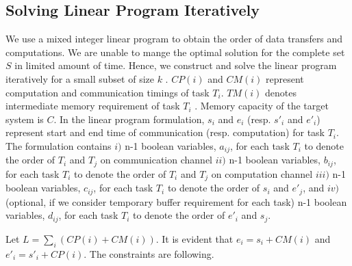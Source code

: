 \documentclass[runningheads]{llncs} %
\begin{document}
\subsection{Solving Linear Program Iteratively}
\label{subsec:linearprogrammingformulation}
We use a mixed integer linear program  to obtain the order of data transfers and computations. We are unable to mange the optimal solution for the complete set $S$ in limited amount of time.  Hence, we construct and solve the linear program iteratively for a small subset of size $k$ . $CP(i)$ and $CM(i)$ represent computation and communication timings of task $T_i$. $TM(i)$ denotes intermediate memory requirement of task $T_i$ . Memory capacity of the  target system is $C$. In the linear program formulation, $s_i$ and $e_i$ (resp. $s'_i$ and $e'_i$) represent start and end time of communication (resp. computation) for task $T_i$. The formulation contains $i)$ n-1 boolean variables, $a_{ij}$, for each task $T_i$ to denote the order of $T_i$ and $T_j$  on communication channel   $ii)$ n-1 boolean variables, $b_{ij}$, for each task $T_i$ to denote the order of $T_i$ and $T_j$  on computation channel $iii)$ n-1 boolean variables, $c_{ij}$, for each task $T_i$ to denote the order of $s_i$ and $e'_j$, and $iv)$ (optional, if we consider temporary buffer requirement for each task) n-1 boolean variables, $d_{ij}$, for each task $T_i$ to denote the order of $e'_i$ and $s_j$.



\noindent Let $L=\sum_i (CP(i) + CM(i))$. It is evident that $e_i =s_i + CM(i)$ and $e'_i =s'_i + CP(i)$. The constraints are following.
\end{document}
